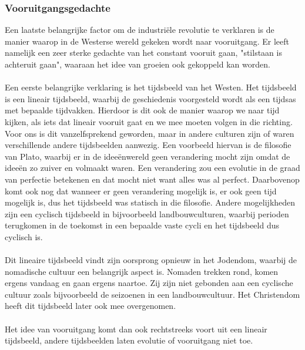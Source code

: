 \documentclass[../summary.tex]{subfiles}
\begin{document}
	\subsubsection{Vooruitgangsgedachte}
	Een laatste belangrijke factor om de industriële revolutie te verklaren is de manier waarop in de Westerse wereld gekeken wordt naar vooruitgang. Er leeft namelijk een zeer sterke gedachte van het constant vooruit gaan, "stilstaan is achteruit gaan", waaraan het idee van groeien ook gekoppeld kan worden.\\
	\\
	Een eerste belangrijke verklaring is het tijdsbeeld van het Westen. Het tijdsbeeld is een lineair tijdsbeeld, waarbij de geschiedenis voorgesteld wordt als een tijdsas met bepaalde tijdvakken. Hierdoor is dit ook de manier waarop we naar tijd kijken, als iets dat lineair vooruit gaat en we mee moeten volgen in die richting. Voor ons is dit vanzelfsprekend geworden, maar in andere culturen zijn of waren verschillende andere tijdsbeelden aanwezig. Een voorbeeld hiervan is de filosofie van Plato, waarbij er in de ideeënwereld geen verandering mocht zijn omdat de ideeën zo zuiver en volmaakt waren. Een verandering zou een evolutie in de graad van perfectie betekenen en dat mocht niet want alles was al perfect. Daarbovenop komt ook nog dat wanneer er geen verandering mogelijk is, er ook geen tijd mogelijk is, dus het tijdsbeeld was statisch in die filosofie. Andere mogelijkheden zijn een cyclisch tijdsbeeld in bijvoorbeeld landbouwculturen, waarbij perioden terugkomen in de toekomst in een bepaalde vaste cycli en het tijdsbeeld dus cyclisch is.\\
	\\
	Dit lineaire tijdsbeeld vindt zijn oorsprong opnieuw in het Jodendom, waarbij de nomadische cultuur een belangrijk aspect is. Nomaden trekken rond, komen ergens vandaag en gaan ergens naartoe. Zij zijn niet gebonden aan een cyclische cultuur zoals bijvoorbeeld de seizoenen in een landbouwcultuur. Het Christendom heeft dit tijdsbeeld later ook mee overgenomen.\\
	\\
	Het idee van vooruitgang komt dan ook rechtstreeks voort uit een lineair tijdsbeeld, andere tijdsbeelden laten evolutie of vooruitgang niet toe. 
	
\end{document}
